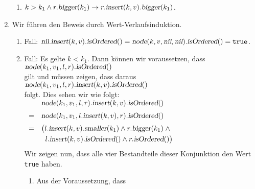 \documentclass{article}
\begin{document}
\begin{enumerate}
\begin{enumerate}
      \item $k > k_1 \wedge r.\textsl{bigger}(k_1)  \rightarrow r.\textsl{insert}(k,v).\textsl{bigger}(k_1)$.
      \end{enumerate}
\item Wir f\"uhren den Beweis durch Wert-Verlaufsinduktion.
      \begin{enumerate}
      \item Fall:
            $\textsl{nil}.\textsl{insert}(k,v).\textsl{isOrdered}() =
             \textsl{node}(k,v,\textsl{nil},\textsl{nil}).\textsl{isOrdered}() = \texttt{true}$.
      \item Fall: Es gelte $k < k_1$.  Dann k\"onnen wir voraussetzen, dass
            \\[0.2cm]
            \hspace*{1.3cm}
            $\textsl{node}(k_1,v_1,l,r).\textsl{isOrdered}()$
            \\[0.2cm]
            gilt und m\"ussen zeigen, dass daraus
            \\[0.2cm]
            \hspace*{1.3cm}
            $\textsl{node}(k_1,v_1,l,r).\textsl{insert}(k,v).\textsl{isOrdered}()$
            \\[0.2cm]
            folgt.  Dies sehen wir wie folgt:
            \\[0.2cm]
            \hspace*{1.3cm}
            $\begin{array}[t]{cl}
                & \textsl{node}(k_1,v_1,l,r).\textsl{insert}(k,v).\textsl{isOrdered}() \\[0.2cm]
              = & \textsl{node}(k_1,v_1,l.\textsl{insert}(k,v),r).\textsl{isOrdered}()     \\[0.2cm]
              = & \bigl(l.\textsl{insert}(k,v).\textsl{smaller}(k_1) \wedge
                        r.\textsl{bigger}(k_1) \;\wedge            \\[0.1cm]
                & \;\;  l.\textsl{insert}(k,v).\textsl{isOrdered}()    \wedge
                        r.\textsl{isOrdered}()\bigr)\\[0.2cm]
            \end{array}
            $
            \\[0.2cm]
            Wir zeigen nun, dass alle vier Bestandteile dieser Konjunktion den Wert
            \texttt{true} haben.
            \begin{enumerate}
            \item Aus der Voraussetzung, dass

\end{enumerate}
\end{enumerate}
\end{enumerate}
\end{document}
